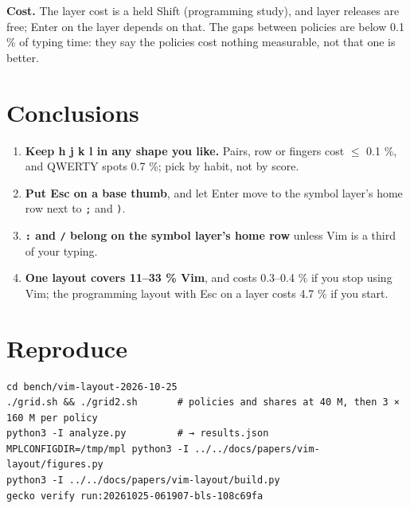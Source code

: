 \documentclass{gecko-paper}
\begin{document}
{\textbf{Cost.} The layer cost is a held Shift (programming study), and layer releases are free; Enter on the layer depends on that. The gaps between policies are below 0.1 \% of typing time: they say the policies cost nothing measurable, not that one is better.

\section{Conclusions}

\begin{enumerate}
\def\labelenumi{\arabic{enumi}.}
\setlength{\itemsep}{1pt}\setlength{\parskip}{0pt}
\item
  \textbf{Keep h j k l in any shape you like.} Pairs, row or fingers cost $\leq$ 0.1 \%, and QWERTY spots 0.7 \%; pick by habit, not by score.
\item
  \textbf{Put Esc on a base thumb}, and let Enter move to the symbol layer's home row next to \texttt{;} and \texttt{)}.
\item
  \textbf{\texttt{:} and \texttt{/} belong on the symbol layer's home row} unless Vim is a third of your typing.
\item
  \textbf{One layout covers 11–33 \% Vim}, and costs 0.3–0.4 \% if you stop using Vim; the programming layout with Esc on a layer costs 4.7 \% if you start.
\end{enumerate}

\section{Reproduce}

\begin{verbatim}
cd bench/vim-layout-2026-10-25
./grid.sh && ./grid2.sh       # policies and shares at 40 M, then 3 × 160 M per policy
python3 -I analyze.py         # → results.json
MPLCONFIGDIR=/tmp/mpl python3 -I ../../docs/papers/vim-layout/figures.py
python3 -I ../../docs/papers/vim-layout/build.py
gecko verify run:20261025-061907-bls-108c69fa
\end{verbatim}

}
\end{document}
